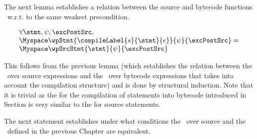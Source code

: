 The next lemma establishes  a relation between the source and bytecode functions \wpName \ w.r.t. to the same weakest precondition. 

\begin{wpStmtBcSrc1} \label{wpStmtBcSrc1}
 
$$ 
    \begin{array}{l}
    \forall \stmt, \psi, \excPostSrc , \\
       \Myspace  \wpStmt{\compileLabel{s}{\stmt}{e}}{ \psi }{ \excPostSrc }  = \\
       \Myspace   \wpSrcStmt{\stmt  }{\psi }{ \excPostSrc }  
	 
    \end{array}
 $$
\end{wpStmtBcSrc1}

This follows from the previous lemma (which establishes the relation between the \wpName \ over source expressions and
 the \wpName \ over bytecode expressions that takes into account the compilation structure)
and is done by structural induction. Note that it is trivial as the \wpName{} for the compilation of statements  into bytecode  introduced in Section 
is very similar to the \wpName{} for source statements. 


 

 

The next statement establishes under what conditions
 the \wpName \  over source and the \wpName \ defined in the previous Chapter are equivalent.

